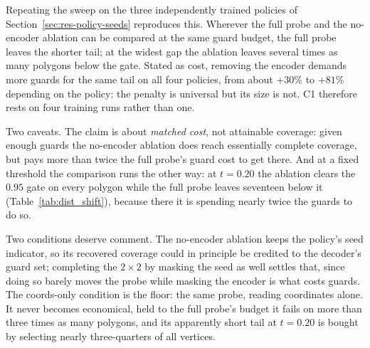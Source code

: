 \documentclass[11pt]{article}
\begin{document}
Repeating the sweep on the three independently trained policies of Section~\ref{sec:res-policy-seeds} reproduces this. Wherever the full probe and the no-encoder ablation can be compared at the same guard budget, the full probe leaves the shorter tail; at the widest gap the ablation leaves several times as many polygons below the gate. Stated as cost, removing the encoder demands more guards for the same tail on all four policies, from about $+30\%$ to $+81\%$ depending on the policy: the penalty is universal but its size is not. C1 therefore rests on four training runs rather than one.

Two caveats. The claim is about \emph{matched cost}, not attainable coverage: given enough guards the no-encoder ablation does reach essentially complete coverage, but pays more than twice the full probe's guard cost to get there. And at a fixed threshold the comparison runs the other way: at $t = 0.20$ the ablation clears the $0.95$ gate on every polygon while the full probe leaves seventeen below it (Table~\ref{tab:dist_shift}), because there it is spending nearly twice the guards to do so.

Two conditions deserve comment. The no-encoder ablation keeps the policy's seed indicator, so its recovered coverage could in principle be credited to the decoder's guard set; completing the $2\times2$ by masking the seed as well settles that, since doing so barely moves the probe while masking the encoder is what costs guards. The coords-only condition is the floor: the same probe, reading coordinates alone. It never becomes economical, held to the full probe's budget it fails on more than three times as many polygons, and its apparently short tail at $t = 0.20$ is bought by selecting nearly three-quarters of all vertices.

\begin{table}[!ht]
  \centering
  \footnotesize
  
  \caption{Encoder--seed ablation on \texttt{test} ($362$ polygons), all probes at $t = 0.20$, four-seed mean $\pm$ std. The rows are the $2\times2$ on/off combinations of the two \emph{ablated} inputs of Eq.~\eqref{eq:setpred-feat}, the frozen encoder embedding and the policy's seed indicator; the coordinates are read in every row. An absent input is masked to zeros, leaving architecture and parameter count unchanged. Read the tail and cost columns together: at a fixed threshold the rows without the encoder show a short tail only by selecting far more vertices, so their tail reflects set size rather than selection quality. The encoder comparison is drawn at matched guard budget instead (Table~\ref{tab:ablation_thresholds}), where the ordering reverses.}
  \label{tab:ablation}
\end{table}
\end{document}
